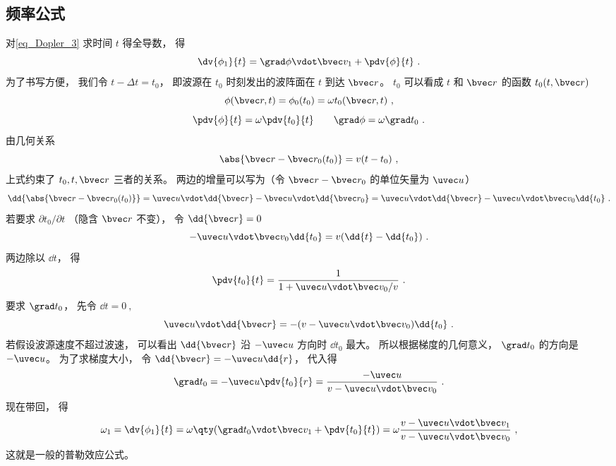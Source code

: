 \subsection{频率公式}
对\autoref{eq_Dopler_3} 求时间 $t$ 得全导数， 得
\begin{equation}
\dv{\phi_1}{t} = \grad\phi \vdot \bvec v_1 + \pdv{\phi}{t}~.
\end{equation}
为了书写方便， 我们令 $t - \Delta t = t_0$， 即波源在 $t_0$ 时刻发出的波阵面在 $t$ 到达 $\bvec r$。 $t_0$ 可以看成 $t$ 和 $\bvec r$ 的函数  $t_0(t, \bvec r)$
\begin{equation}
\phi(\bvec r, t) =  \phi_0(t_0) = \omega t_0(\bvec r, t)~,
\end{equation}
\begin{equation}
\pdv{\phi}{t} = \omega \pdv{t_0}{t} \qquad
\grad \phi = \omega \grad t_0~.
\end{equation}
由几何关系
\begin{equation}
\abs{\bvec r - \bvec r_0(t_0)} = v(t - t_0)~,
\end{equation}
上式约束了 $t_0, t, \bvec r$ 三者的关系。 两边的增量可以写为（令 $\bvec r - \bvec r_0$ 的单位矢量为 $\uvec u$）
\begin{equation}
\dd{\abs{\bvec r - \bvec r_0(t_0)}} = \uvec u \vdot \dd{\bvec r} - \bvec u \vdot \dd{\bvec r_0} = \uvec u \vdot \dd{\bvec r} - \uvec u \vdot \bvec v_0 \dd{t_0}~.
\end{equation}
若要求 $\partial t_0 / \partial t$ （隐含 $\bvec r$ 不变）， 令 $\dd{\bvec r} = 0$
\begin{equation}
-\uvec u \vdot \bvec v_0 \dd{t_0} = v(\dd{t} - \dd{t_0})~.
\end{equation}
两边除以 $\dd{t}$， 得
\begin{equation}
\pdv{t_0}{t} = \frac{1}{1 + \uvec u \vdot \bvec v_0/v}~.
\end{equation}
要求 $\grad t_0$， 先令 $\dd{t} = 0~,$
\begin{equation}
\uvec u \vdot \dd{\bvec r} = -(v - \uvec u \vdot \bvec v_0) \dd{t_0}~.
\end{equation}
若假设波源速度不超过波速， 可以看出 $\dd{\bvec r}$ 沿 $-\uvec u$ 方向时 $\dd{t_0}$ 最大。 所以根据梯度的几何意义， $\grad t_0$ 的方向是 $-\uvec u$。 为了求梯度大小， 令 $\dd{\bvec r} = -\uvec u \dd{r}$， 代入得
\begin{equation}
\grad t_0 = -\uvec u \pdv{t_0}{r} = \frac{ - \uvec u}{v - \uvec u \vdot \bvec v_0}~.
\end{equation}
现在带回， 得
\begin{equation}
\omega_1 = \dv{\phi_1}{t} = \omega\qty(\grad t_0 \vdot \bvec v_1 + \pdv{t_0}{t}) = \omega \frac{v - \uvec u \vdot \bvec v_1}{v - \uvec u \vdot \bvec v_0}~,
\end{equation}
这就是一般的普勒效应公式。
